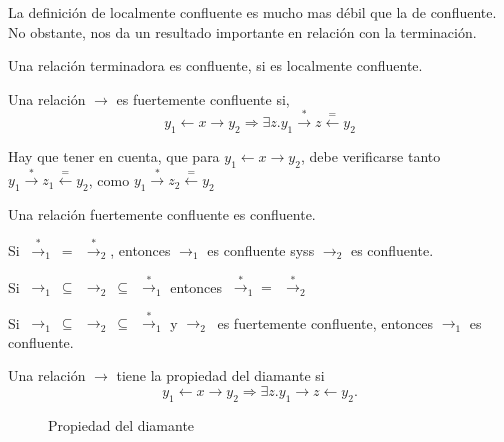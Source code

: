 La definición de localmente confluente es mucho mas débil que la de
confluente. No obstante, nos da un resultado importante en relación con la
terminación.

\begin{lema} 
  Una relación terminadora es confluente, si es localmente confluente.
\end{lema}

\begin{defi}
  Una relación $\rightarrow$ es fuertemente confluente si,
  \[
    y_1 \leftarrow x \rightarrow y_2 \Rightarrow 
    \exists z.  y_1 \xrightarrow{*} z \xleftarrow{=} y_2
  \] 
\end{defi}

Hay que tener en cuenta, que para $y_1 \leftarrow x \rightarrow y_2$, debe
verificarse tanto $y_1 \xrightarrow{*} z_1 \xleftarrow{=} y_2$, como
$y_1 \xrightarrow{*} z_2 \xleftarrow{=} y_2$

\begin{lema} 
  Una relación fuertemente confluente es confluente.
\end{lema}

\begin{lema} 
  Si $ \ \xrightarrow{*}_1 \ = \ \ \xrightarrow{*}_2$, entonces $\rightarrow_1$
  es confluente syss $\rightarrow_2$ es confluente.
\end{lema}

\begin{lema}
  Si
  $ \ \rightarrow_1 \ \subseteq \ \ \rightarrow_2 \ \subseteq \ \
  \xrightarrow{*}_1 $ entonces $ \ \xrightarrow{*}_1 = \ \ \xrightarrow{*}_2$
\end{lema}

\begin{coro}
  Si
  $ \ \rightarrow_1 \ \subseteq \ \ \rightarrow_2 \ \subseteq \ \
  \xrightarrow{*}_1 $ y $\rightarrow_2 \ $ es fuertemente confluente, entonces
  $\rightarrow_1$ es confluente.
\end{coro}


\begin{defi}
  Una relación $\rightarrow$ tiene la propiedad del diamante si
  \[
    y_1 \leftarrow x \rightarrow y_2 \Rightarrow \exists z. y_1 \rightarrow z \leftarrow y_2. 
  \]
\end{defi} 

\begin{figure}[h]
  \centering
        
\caption{Propiedad del diamante}
\end{figure}    


